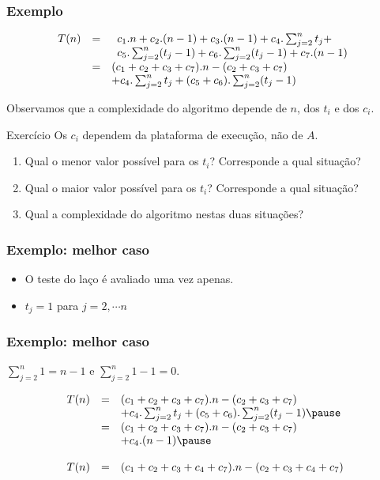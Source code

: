 \documentclass{beamer}
\begin{document}
\begin{frame}
  \frametitle{Exemplo}

  $$
  \begin{array}{rcl}
    T(n) & = & \begin{array}[t]{l}
      c_1.n+c_2.(n-1)+c_3.(n-1)+c_4.\sum_{j=2}^{n} t_j + \\
      c_5.\sum_{j=2}^{n} (t_j-1) + c_6.\sum_{j=2}^{n} (t_j-1)+c_7.(n-1) \\
      \end{array} \\
    & = & (c_1+c_2+c_3+c_7).n  - (c_2 + c_3 + c_7) \\
    & & + c_4.\sum_{j=2}^{n} t_j+ (c_5+c_6).\sum_{j=2}^{n} (t_j-1)
  \end{array}
  $$

  Observamos que a complexidade do algoritmo depende de $n$, dos $t_i$ e dos
  $c_i$.
  \pause
  \begin{block}{Exercício}
    Os $c_i$ dependem da plataforma de execução, não de $A$.
    \begin{enumerate}
    \item Qual o menor valor possível para os $t_i$? Corresponde a qual situação?
    \item Qual o maior valor possível para os $t_i$? Corresponde a qual situação?
    \item Qual a complexidade do algoritmo nestas duas situações?
    \end{enumerate}
  \end{block}

\end{frame}

\begin{frame}

\frametitle{Exemplo: melhor caso}

  

  \begin{itemize}
    \item O teste do laço é avaliado uma vez apenas.
    \item $t_j = 1$ para $j = 2, \cdots n$
  \end{itemize}

\end{frame}

\begin{frame}

\frametitle{Exemplo: melhor caso}

$\sum_{j=2}^{n} 1 = n-1$ e $\sum_{j=2}^{n} 1 - 1 = 0$.

  $$
  \begin{array}{rcl}
    T(n) & = & (c_1+c_2+c_3+c_7).n  - (c_2 + c_3 + c_7) \\
    & & + c_4.\sum_{j=2}^{n} t_j+ (c_5+c_6).\sum_{j=2}^{n} (t_j-1) \pause \\
    & = & (c_1+c_2+c_3+c_7).n - (c_2 + c_3 +c_7) \\
    & & + c_4.(n-1) \pause \\
    \\
    T(n) & = & (c_1+c_2+c_3+c_4+c_7).n - (c_2 + c_3 + c_4 + c_7)
  \end{array}
  $$

\end{frame}
\end{document}
